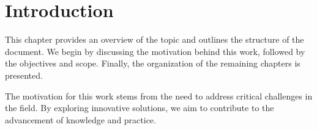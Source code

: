 \chapter{Introduction}
    This chapter provides an overview of the topic and outlines the structure of the document. 
    We begin by discussing the motivation behind this work, followed by the objectives and scope. 
    Finally, the organization of the remaining chapters is presented.\par

    The motivation for this work stems from the need to address critical challenges in the field. 
    By exploring innovative solutions, we aim to contribute to the advancement of knowledge and practice.